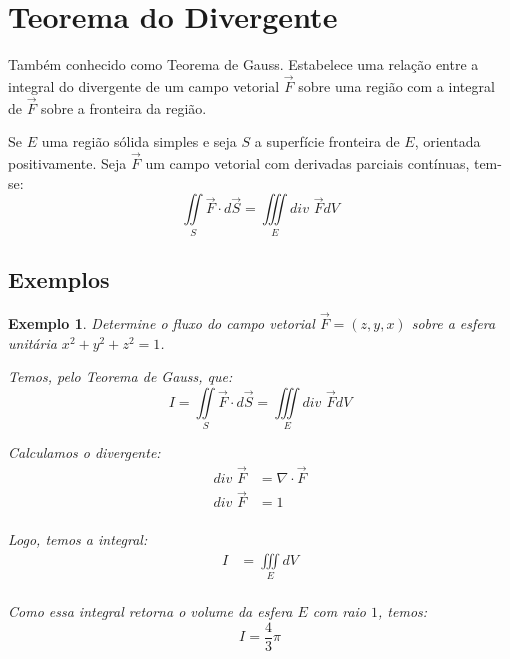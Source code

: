 \documentclass{article}
\newcommand{\doubleint}[2] {\iint\limits_{#1} #2}
\newcommand{\tripleint}[2] {\iiint\limits_{#1} #2}
\newcommand{\Div}[0] {\textit{div }}
\newtheorem{example}{Exemplo}[section]
\begin{document}
    \section{Teorema do Divergente}
        Também conhecido como Teorema de Gauss. Estabelece uma relação entre a integral do divergente de um
        campo vetorial $\vec{F}$ sobre uma região com a integral de $\vec{F}$ sobre a fronteira da
        região.

        Se $E$ uma região sólida simples e seja $S$ a superfície fronteira de $E$, orientada positivamente.
        Seja $\vec{F}$ um campo vetorial com derivadas parciais contínuas, tem-se:
        \[
            \doubleint{S}{\vec{F} \cdot d\vec{S}} = \tripleint{E}{\Div \vec{F} dV}
        \]

        \subsection{Exemplos}
            \begin{example}
                Determine o fluxo do campo vetorial $\vec{F} = (z, y, x)$ sobre a esfera
                unitária $x^2 + y^2 + z^2 = 1$.

                Temos, pelo Teorema de Gauss, que:
                \[
                    I = \doubleint{S}{\vec{F} \cdot d\vec{S}} = \tripleint{E}{\Div \vec{F} dV}
                \]

                Calculamos o divergente:
                \begin{align*}
                    \Div \vec{F} &= \nabla \cdot \vec{F}\\
                    \Div \vec{F} &= 1\\
                \end{align*}

                Logo, temos a integral:
                \begin{align*}
                    I &= \tripleint{E}{dV}\\
                \end{align*}

                Como essa integral retorna o volume da esfera $E$ com raio $1$, temos:
                \[
                    I = \frac{4}{3}\pi
                \]
            \end{example}
\end{document}
